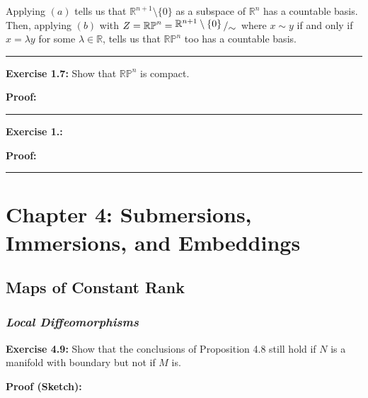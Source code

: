 \documentclass{article}
\newcommand{\bigslant}[2]{{\raisebox{.2em}{$#1$}\left/\raisebox{-.2em}{$#2$}\right.}}
\begin{document}
\vskip 0.5cm
Applying $(a)$ tells us that $\mathbb{R}^{n+1} \setminus \{0\}$ as a subspace of $\mathbb{R}^n$ has a countable basis. Then, applying $(b)$ with $Z = \mathbb{RP}^n = \bigslant{\mathbb{R}^{n+1} \setminus \{0\}}{\sim}$ where $x \sim y$ if and only if $x = \lambda y$ for some $\lambda \in \mathbb{R}$, tells us that $\mathbb{RP}^n$ too has a countable basis.
 
\vskip 0.5cm
\hrule
\vskip 0.5cm

\textbf{Exercise 1.7:} Show that $\mathbb{RP}^n$ is compact.  

\vskip 0.5cm

\textbf{Proof:}

\vskip 0.5cm
\hrule
\vskip 0.5cm

\textbf{Exercise 1.:} 

\vskip 0.5cm

\textbf{Proof:}

\vskip 0.5cm
\hrule
\vskip 0.5cm

\pagebreak

\section{Chapter 4: Submersions, Immersions, and Embeddings}

\vskip 1cm
\subsection{Maps of Constant Rank}

\vskip 1cm
\subsubsection{\emph{Local Diffeomorphisms}}

\vskip 1cm
\textbf{Exercise 4.9:} Show that the conclusions of Proposition 4.8 still hold if $N$ is a manifold with boundary but not if $M$ is.
\vskip 0.5cm

\textbf{Proof (Sketch):}
\end{document}
